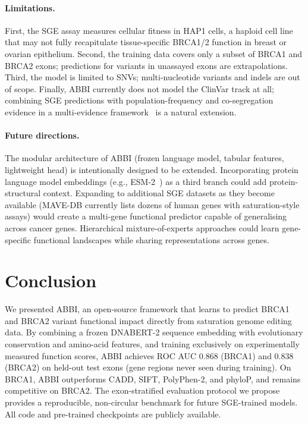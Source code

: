 \documentclass[12pt]{article}
\newcommand{\abbi}{\textsc{ABBI}}
\begin{document}
\paragraph{Limitations.}
First, the SGE assay measures cellular fitness in HAP1 cells, a haploid cell line that
may not fully recapitulate tissue-specific BRCA1/2 function in breast or ovarian
epithelium.
Second, the training data covers only a subset of BRCA1 and BRCA2 exons;
predictions for variants in unassayed exons are extrapolations.
Third, the model is limited to SNVs; multi-nucleotide variants and indels are out of scope.
Finally, \abbi{} currently does not model the ClinVar track at all; combining SGE
predictions with population-frequency and co-segregation evidence in a multi-evidence
framework~\citep{enigma} is a natural extension.

\paragraph{Future directions.}
The modular architecture of \abbi{} (frozen language model, tabular features,
lightweight head) is intentionally designed to be extended.
Incorporating protein language model embeddings (e.g., ESM-2~\citep{esm2}) as a third
branch could add protein-structural context.
Expanding to additional SGE datasets as they become available (MAVE-DB currently lists
dozens of human genes with saturation-style assays) would create a multi-gene functional
predictor capable of generalising across cancer genes.
Hierarchical mixture-of-experts approaches could learn gene-specific functional
landscapes while sharing representations across genes.

\section{Conclusion}
\label{sec:conclusion}

We presented \abbi{}, an open-source framework that learns to predict BRCA1 and BRCA2
variant functional impact directly from saturation genome editing data.
By combining a frozen DNABERT-2 sequence embedding with evolutionary conservation
and amino-acid features, and training exclusively on experimentally measured
function scores, \abbi{} achieves ROC AUC 0.868 (BRCA1) and 0.838 (BRCA2) on
held-out test exons (gene regions never seen during training).
On BRCA1, \abbi{} outperforms CADD, SIFT, PolyPhen-2, and phyloP, and remains
competitive on BRCA2.
The exon-stratified evaluation protocol we propose provides a reproducible,
non-circular benchmark for future SGE-trained models.
All code and pre-trained checkpoints are publicly available.
\end{document}
